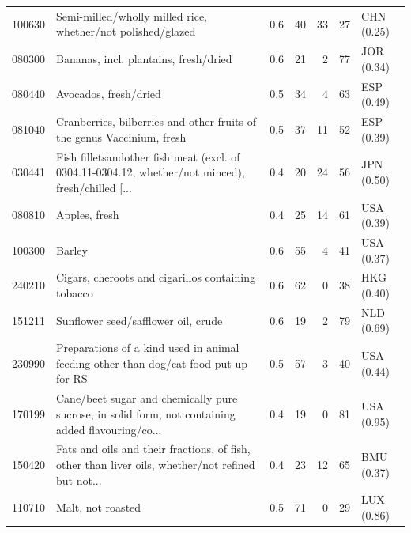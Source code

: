 \begin{tabular}{@{}l p{6.4cm} r r r r l@{}}
100630 & Semi-milled/\allowbreak{}wholly milled rice, whether/\allowbreak{}not polished/\allowbreak{}glazed & 0.6 & 40 & 33 & 27 & CHN (0.25) \\
080300 & Bananas, incl. plantains, fresh/\allowbreak{}dried & 0.6 & 21 & 2 & 77 & JOR (0.34) \\
080440 & Avocados, fresh/\allowbreak{}dried & 0.5 & 34 & 4 & 63 & ESP (0.49) \\
081040 & Cranberries, bilberries and other fruits of the genus Vaccinium, fresh & 0.5 & 37 & 11 & 52 & ESP (0.39) \\
030441 & Fish filletsandother fish meat (excl. of 0304.11-0304.12, whether/\allowbreak{}not minced), fresh/\allowbreak{}chilled [... & 0.4 & 20 & 24 & 56 & JPN (0.50) \\
080810 & Apples, fresh & 0.4 & 25 & 14 & 61 & USA (0.39) \\
100300 & Barley & 0.6 & 55 & 4 & 41 & USA (0.37) \\
240210 & Cigars, cheroots and cigarillos containing tobacco & 0.6 & 62 & 0 & 38 & HKG (0.40) \\
151211 & Sunflower seed/\allowbreak{}safflower oil, crude & 0.6 & 19 & 2 & 79 & NLD (0.69) \\
230990 & Preparations of a kind used in animal feeding other than dog/\allowbreak{}cat food put up for RS & 0.5 & 57 & 3 & 40 & USA (0.44) \\
170199 & Cane/\allowbreak{}beet sugar and chemically pure sucrose, in solid form, not containing added flavouring/\allowbreak{}co... & 0.4 & 19 & 0 & 81 & USA (0.95) \\
150420 & Fats and oils and their fractions, of fish, other than liver oils, whether/\allowbreak{}not refined but not... & 0.4 & 23 & 12 & 65 & BMU (0.37) \\
110710 & Malt, not roasted & 0.5 & 71 & 0 & 29 & LUX (0.86) \\
\bottomrule
\end{tabular}
